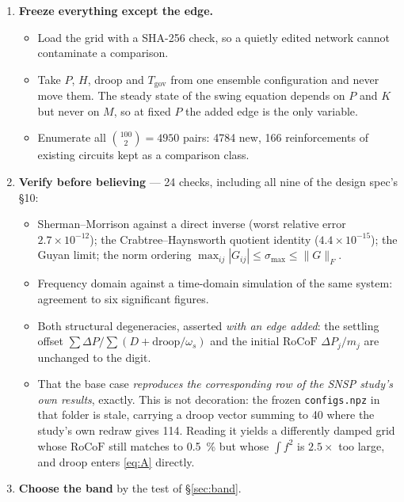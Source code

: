 \documentclass[11pt,a4paper]{article}
\newcommand{\rocof}{\ensuremath{\mathrm{RoCoF}}}
\begin{document}
\begin{enumerate}[label=\textbf{\arabic*.}]

\item \textbf{Freeze everything except the edge.}
\begin{itemize}
  \item Load the grid with a SHA-256 check, so a quietly edited network cannot
        contaminate a comparison.
  \item Take $P$, $H$, droop and $T_{\mathrm{gov}}$ from one ensemble
        configuration and never move them. The steady state of the swing
        equation depends on $P$ and $K$ but never on $M$, so at fixed $P$ the
        added edge is the only variable.
  \item Enumerate all $\binom{100}{2}=4950$ pairs: 4784 new, 166 reinforcements
        of existing circuits kept as a comparison class.
\end{itemize}

\item \textbf{Verify before believing} --- 24 checks, including all nine of the
      design spec's \S10:
\begin{itemize}
  \item Sherman--Morrison against a direct inverse (worst relative error
        $2.7\times10^{-12}$); the Crabtree--Haynsworth quotient identity
        ($4.4\times10^{-15}$); the Guyan limit; the norm ordering
        $\max_{ij}|G_{ij}|\le\sigma_{\max}\le\|G\|_F$.
  \item Frequency domain against a time-domain simulation of the same system:
        agreement to six significant figures.
  \item Both structural degeneracies, asserted \emph{with an edge added}: the
        settling offset $\sum\Delta P/\sum(D+\mathrm{droop}/\omega_s)$ and the
        initial \rocof{} $\Delta P_j/m_j$ are unchanged to the digit.
  \item That the base case \emph{reproduces the corresponding row of the SNSP
        study's own results}, exactly. This is not decoration: the frozen
        \texttt{configs.npz} in that folder is stale, carrying a droop vector
        summing to 40 where the study's own redraw gives 114. Reading it yields
        a differently damped grid whose \rocof{} still matches to
        \SI{0.5}{\percent} but whose $\int f^2$ is $2.5\times$ too large, and
        droop enters \eqref{eq:A} directly.
\end{itemize}

\item \textbf{Choose the band} by the test of \S\ref{sec:band}.


\end{enumerate}
\end{document}
